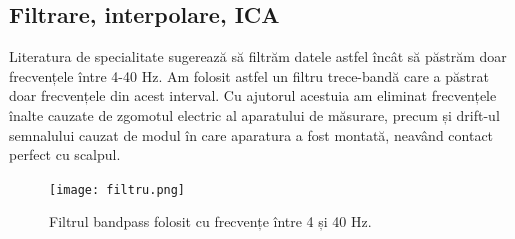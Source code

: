 

\subsection{Filtrare, interpolare, ICA}

Literatura de specialitate sugerează să filtrăm datele astfel încât să păstrăm doar frecvențele între 4-40 Hz\cite{intro_to_mne}. Am folosit astfel un filtru trece-bandă care a păstrat doar frecvențele din acest interval. Cu ajutorul acestuia am eliminat frecvențele înalte cauzate de zgomotul electric al aparatului de măsurare, precum și drift-ul semnalului cauzat de modul în care aparatura a fost montată, neavând contact perfect cu scalpul.  %

\setlength{\abovecaptionskip}{0pt}
\setlength{\belowcaptionskip}{0pt}
\begin{figure}[H]
    \centering
		\vspace{-1em}
    \texttt{[image: filtru.png]}
    \caption{Filtrul bandpass folosit cu frecvențe între 4 și 40 Hz.}
		\vspace{-1em}
    \label{fig:vizualizare_filtru}
\end{figure}

